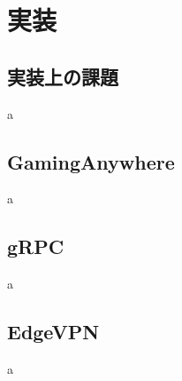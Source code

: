 \section{実装}

\subsection{実装上の課題}
a
\subsection{GamingAnywhere}
a
\subsection{gRPC}
a

\subsection{EdgeVPN}
a